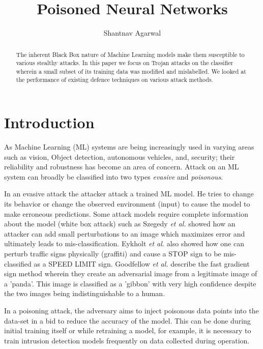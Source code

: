 \documentclass{article}
\title{Poisoned Neural Networks}
\author{
Shantnav Agarwal
}
\newcommand{\etal}[0]{\emph{et al.}}
\begin{document}
\maketitle

\begin{abstract}
The inherent Black Box nature of Machine Learning models make them susceptible to various stealthy attacks. In this paper we focus on Trojan attacks on the classifier wherein a small subset of its training data was modified and mislabelled. 
We looked at the performance of existing defence techniques on various attack methods.
\end{abstract}


\section{Introduction}
As Machine Learning (ML) systems are being increasingly used in varying areas such as vision, Object detection, autonomous vehicles, and, security; their reliability and robustness has become an area of concern. Attack on an ML system can broadly be classified into two types \emph{evasive} and \emph{poisonous}.\cite{vorobeychikAdversarialMachineLearning2018}

In an evasive attack the attacker attack a trained ML model. He tries to change its behavior or change the observed environment (input) to cause the model to make erroneous predictions. Some attack models require complete information about the model (white box attack) such as Szegedy \etal \cite{szegedyIntriguingPropertiesNeural2013} showed how an attacker can add small perturbations to an image which maximizes error and ultimately leads to mis-classification. Eykholt \etal \cite{eykholtRobustPhysicalWorldAttacks2017} also showed how one can perturb traffic signs physically (graffiti) and cause a STOP sign to be mis-classified as a SPEED LIMIT sign. Goodfellow \etal \cite{goodfellowExplainingHarnessingAdversarial2014} describe the fast gradient sign method wherein they create an adversarial image from a legitimate image of a 'panda'. This image is classified as a 'gibbon' with very high confidence despite the two images being indistinguishable to a human.

In a poisoning attack, the adversary aims to inject poisonous data points into the data-set in a bid to reduce the accuracy of the model. This can be done during initial training itself or while retraining a model, for example, it is necessary to train intrusion detection models frequently on data collected during operation. 
\end{document}

